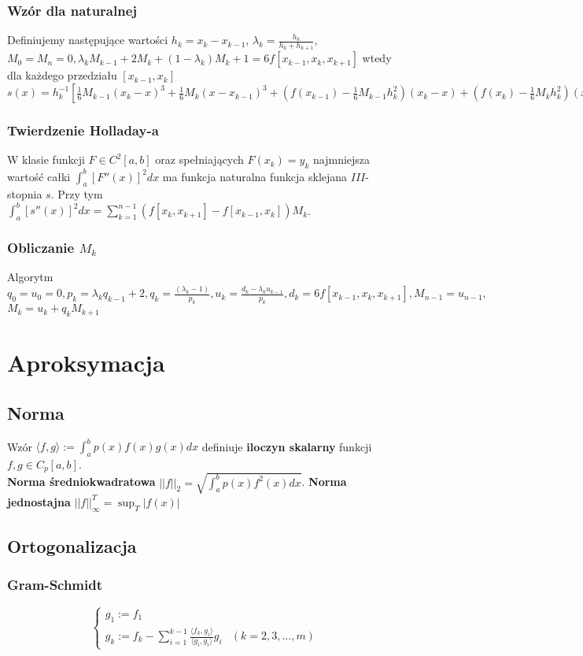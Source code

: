 \documentclass{article}
\begin{document}
\begin{minipage}[t]{.33\textwidth}
\subsubsection*{Wzór dla naturalnej}
Definiujemy następujące wartości $h_k = x_k - x_{k-1}$, $\lambda_k = \frac{h_k}{h_k + h_{k+1}}$,  $M_0 = M_n = 0, \lambda_k M_{k-1} + 2M_k + (1-\lambda_k) M_k+1=6f[x_{k-1},x_k,x_{k+1}]$ wtedy dla każdego przedziału $[x_{k-1},x_k]$ $s(x) = h_k^{-1}[\frac{1}{6}M_{k-1}(x_k - x)^3 + \frac{1}{6}M_k(x-x_{k-1})^3 + (f(x_{k-1}) - \frac{1}{6}M_{k-1}h_k^2)(x_k -x) + (f(x_k) - \frac{1}{6}M_kh_k^2)(x-x_{k-1})]$
\end{minipage}
\newpage
\setlength{\abovedisplayskip}{0.0pt}
\setlength{\belowdisplayskip}{0.0pt}
\setlength{\tabcolsep}{0.0pt}
\begin{minipage}[t]{.33\textwidth}

\subsubsection*{Twierdzenie Holladay-a}
W klasie funkcji $F\in C^2[a,b]$ oraz spełniających $F(x_k) = y_k$ najmniejsza wartość całki $\int_a^b[F''(x)]^2 dx$ ma funkcja naturalna funkcja sklejana $III$-stopnia $s$. Przy tym $\int_a^b[s''(x)]^2dx = \sum_{k=1}^{n-1}(f[x_k,x_{k+1}]-f[x_{k-1},x_{k}])M_k$.
\subsubsection*{Obliczanie $M_k$}
Algorytm $q_0 = u_0 = 0, p_k = \lambda_k q_{k-1} + 2, q_k = \frac{(\lambda_k - 1)}{p_k},u_k = \frac{d_k -\lambda_k u_{k-1}}{p_k},d_k = 6f[x_{k-1},x_k,x_{k+1}],M_{n-1}=u_{n-1},$ $M_k = u_k + q_k M_{k+1}$
\section*{Aproksymacja}
\subsection*{Norma}
Wzór $\langle f,g \rangle := \int_a^b p(x)f(x)g(x)dx$ definiuje \textbf{iloczyn skalarny} funkcji $f,g \in C_p[a,b]$.\\
\textbf{Norma średniokwadratowa} $||f||_2 = \sqrt{\int_a^b p(x)f^2(x)dx}$. \textbf{Norma jednostajna} $||f||_\infty^T = \sup_T |f(x)|$
\subsection*{Ortogonalizacja}
\subsubsection*{Gram-Schmidt}
\begin{equation*}
    \begin{cases}
        g_1 := f_1 \\
        g_k := f_k - \sum_{i=1}^{k-1}\frac{\langle f_k,g_i\rangle}{\langle g_i, g_i\rangle}g_i & (k=2,3,...,m)
    \end{cases}
\end{equation*}

\end{minipage}
\end{document}
